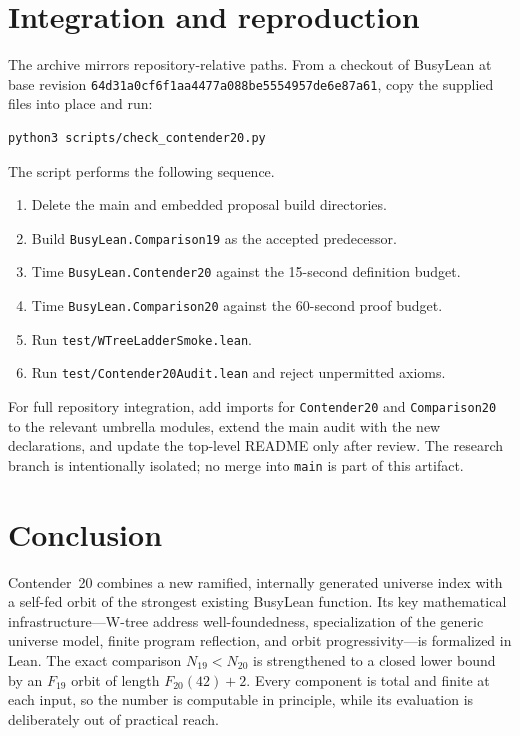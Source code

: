 \documentclass[11pt]{article}
\theoremstyle{definition}
\theoremstyle{remark}
\newcommand{\BaseCommit}{\texttt{64d31a0cf6f1aa4477a088be5554957de6e87a61}}
\begin{document}
\section{Integration and reproduction}
\label{sec:reproduce}

The archive mirrors repository-relative paths.  From a checkout of BusyLean at
base revision \BaseCommit{}, copy the supplied files into place and run:

\begin{lstlisting}[language={},numbers=none]
python3 scripts/check_contender20.py
\end{lstlisting}

The script performs the following sequence.

\begin{enumerate}[leftmargin=2.2em]
\item Delete the main and embedded proposal build directories.
\item Build \texttt{BusyLean.Comparison19} as the accepted predecessor.
\item Time \texttt{BusyLean.Contender20} against the 15-second definition
  budget.
\item Time \texttt{BusyLean.Comparison20} against the 60-second proof budget.
\item Run \texttt{test/WTreeLadderSmoke.lean}.
\item Run \texttt{test/Contender20Audit.lean} and reject unpermitted axioms.
\end{enumerate}

For full repository integration, add imports for \texttt{Contender20} and
\texttt{Comparison20} to the relevant umbrella modules, extend the main audit
with the new declarations, and update the top-level README only after review.
The research branch is intentionally isolated; no merge into \texttt{main} is
part of this artifact.

\section{Conclusion}

Contender~20 combines a new ramified, internally generated universe index with
a self-fed orbit of the strongest existing BusyLean function.  Its key
mathematical infrastructure---W-tree address well-foundedness, specialization
of the generic universe model, finite program reflection, and orbit
progressivity---is formalized in Lean.  The exact comparison
$N_{19}<N_{20}$ is strengthened to a closed lower bound by an $F_{19}$ orbit of
length $F_{20}(42)+2$.  Every component is total and finite at each input, so
the number is computable in principle, while its evaluation is deliberately
out of practical reach.
\end{document}
